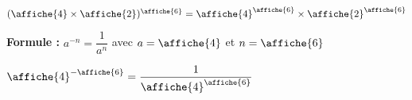 \documentclass[12pt]{article}
\begin{document}
{\begin{multicols}{2}
{{{{                    $(\affiche{\a} \times \affiche{\b})^{\affiche{\n}} = \affiche{\a}^{\affiche{\n}} \times \affiche{\b}^{\affiche{\n}}$
                    }{
                    \textbf{Formule :} $a^{-n} = \dfrac{1}{a^n}$ avec $a = \affiche{\a}$ et $n = \affiche{\n}$
                    
                    $\affiche{\a}^{-\affiche{\n}} = \dfrac{1}{\affiche{\a}^{\affiche{\n}}}$
    }}}}
    
\end{multicols}
}
\end{document}
